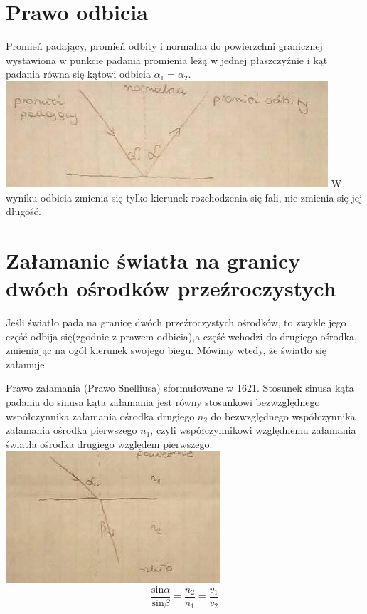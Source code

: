 \documentclass[a4paper,12pt]{scrbook} %
\begin{document}
\section{Prawo odbicia}
Promień padający, promień odbity i normalna do powierzchni granicznej wystawiona w punkcie padania promienia leżą w jednej płaszczyźnie i kąt padania równa się kątowi odbicia $\alpha _{1} = \alpha _{2}$. \\\includegraphics{prawo_odbicia}
W wyniku odbicia zmienia się tylko kierunek rozchodzenia się fali, nie zmienia się jej długość. 

\section{Załamanie światła na granicy dwóch ośrodków przeźroczystych}
Jeśli światło pada na granicę dwóch przeźroczystych ośrodków, to zwykle jego część odbija się(zgodnie z prawem odbicia),a część wchodzi do drugiego ośrodka, zmieniając na ogół kierunek swojego biegu. Mówimy wtedy, że światło się załamuje.

Prawo załamania (Prawo Snelliusa) sformułowane w 1621. Stosunek sinusa kąta padania do sinusa kąta załamania jest równy stosunkowi bezwzględnego współczynnika załamania ośrodka drugiego $n_{2}$ do bezwzględnego współczynnika załamania ośrodka pierwszego $n_{1}$, czyli współczynnikowi względnemu załamania światła ośrodka drugiego względem pierwszego.
\\\includegraphics{prawo_zalamania}
\begin{equation}{\frac{\text{sin}\alpha }{\text{sin}\beta}=\frac{n_{{2}}}{n_{{1}}}=\frac{v_{{1}}}{v_{{2}}}}\end{equation}
\end{document}
